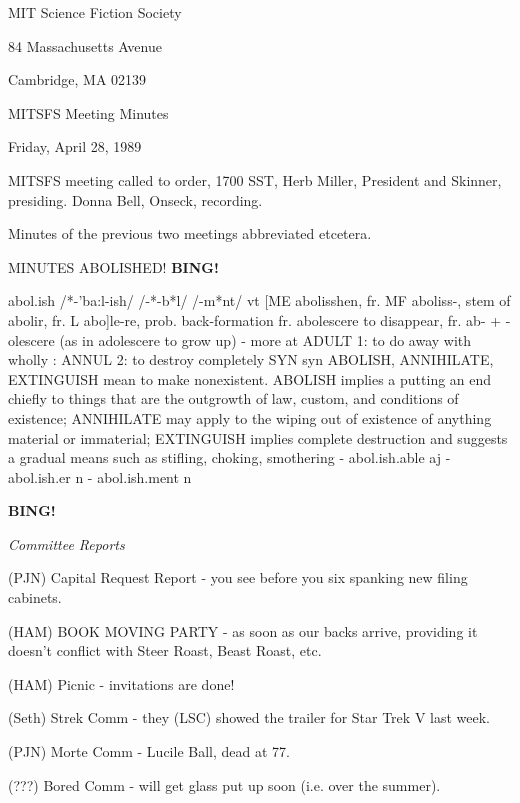 \documentclass[12pt]{article}
\newcommand{\bing}{{\bf BING!} }
\newcommand{\goto}[1]{\bing \vskip 12pt \centerline{{\em{#1}}}}
\begin{document}
\begin{center}

MIT Science Fiction Society 

84 Massachusetts Avenue

Cambridge, MA 02139

\vspace{12pt}

MITSFS Meeting Minutes 

Friday, April 28, 1989

\end{center}
 
\vspace{18pt}

\setlength{\parskip}{6pt}

\noindent
MITSFS meeting called to order, 1700 SST, Herb Miller, President and Skinner, presiding. Donna Bell, Onseck, recording.

Minutes of the previous two meetings abbreviated etcetera.

MINUTES ABOLISHED! \bing

abol.ish /*-'ba:l-ish/ /-*-b*l/ /-m*nt/ vt [ME abolisshen, fr. MF aboliss-, stem of abolir, fr. L abo]le-re, prob. back-formation fr. abolescere to disappear, fr. ab- + -olescere (as in adolescere to grow up) - more at ADULT 1: to do away with wholly : ANNUL 2: to destroy completely SYN syn ABOLISH, ANNIHILATE, EXTINGUISH mean to make nonexistent. ABOLISH implies a putting an end chiefly to things that are the outgrowth of law, custom, and conditions of existence; ANNIHILATE may apply to the wiping out of existence of anything material or immaterial; EXTINGUISH implies complete destruction and suggests a gradual means such as stifling, choking, smothering - abol.ish.able aj - abol.ish.er n - abol.ish.ment n

\goto{Committee Reports}

(PJN) Capital Request Report - you see before you six spanking new filing cabinets.

(HAM) BOOK MOVING PARTY - as soon as our backs arrive, providing it doesn't conflict with Steer Roast, Beast Roast, etc.

(HAM) Picnic - invitations are done!

(Seth) Strek Comm - they (LSC) showed the trailer for Star Trek V last week.

(PJN) Morte Comm - Lucile Ball, dead at 77.

(???) Bored Comm - will get glass put up soon (i.e. over the summer).
\end{document}
